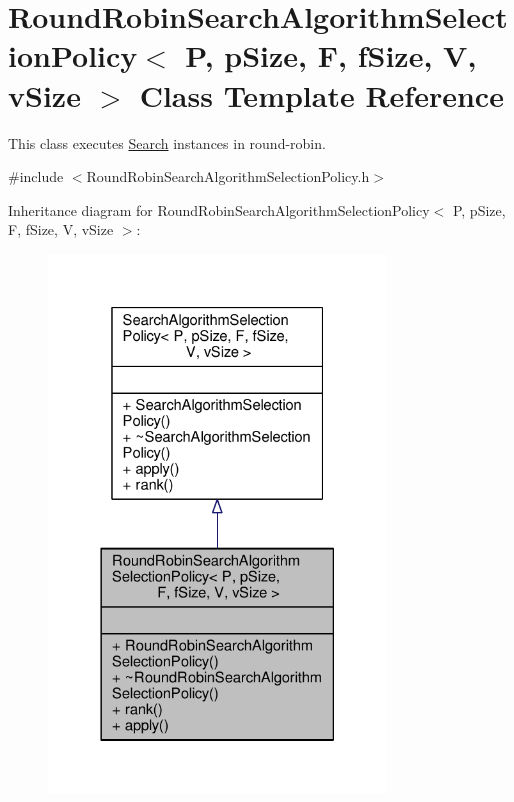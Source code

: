 \hypertarget{classRoundRobinSearchAlgorithmSelectionPolicy}{}\section{Round\+Robin\+Search\+Algorithm\+Selection\+Policy$<$ P, p\+Size, F, f\+Size, V, v\+Size $>$ Class Template Reference}
\label{classRoundRobinSearchAlgorithmSelectionPolicy}


This class executes \hyperlink{classSearch}{Search} instances in round-\/robin.  




{\ttfamily \#include $<$Round\+Robin\+Search\+Algorithm\+Selection\+Policy.\+h$>$}



Inheritance diagram for Round\+Robin\+Search\+Algorithm\+Selection\+Policy$<$ P, p\+Size, F, f\+Size, V, v\+Size $>$\+:\nopagebreak
\begin{figure}[H]
\begin{center}
\leavevmode
\includegraphics[width=254pt]{classRoundRobinSearchAlgorithmSelectionPolicy__inherit__graph}
\end{center}
\end{figure}


